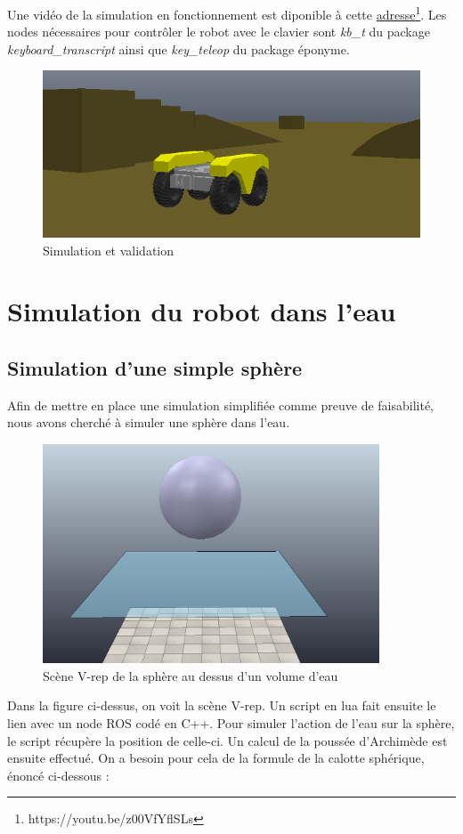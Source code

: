 \documentclass[12pt, openany]{report}
\begin{document}
Une vidéo de la simulation en fonctionnement est diponible à cette \href{https://youtu.be/z00VfYflSLs}{adresse}\footnote{https://youtu.be/z00VfYflSLs}. Les nodes nécessaires pour contrôler le robot avec le clavier sont \textit{kb\_t} du package \textit{keyboard\_transcript} ainsi que \textit{key\_teleop} du package éponyme. 

\begin{figure}[H]
     \centering
     \includegraphics[scale=0.5]{resu.png}     
     \caption{Simulation et validation}
     \label{fig:resu}
\end{figure}


\section{Simulation du robot dans l'eau}


\subsection{Simulation d'une simple sphère}
Afin de mettre en place une simulation simplifiée comme preuve de faisabilité, nous avons cherché à simuler une sphère dans l'eau.\\

\begin{figure}[H]
     \centering
     \includegraphics[width=10cm]{scene sphere.png}     
     \caption{Scène V-rep de la sphère au dessus d'un volume d'eau}
     \label{fig:resu}
\end{figure}
Dans la figure ci-dessus, on voit la scène V-rep. Un script en lua fait ensuite le lien avec un node ROS codé en C++. Pour simuler l'action de l'eau sur la sphère, le script récupère la position de celle-ci. Un calcul de la poussée d'Archimède est ensuite effectué. On a besoin pour cela de la formule de la calotte sphérique, énoncé ci-dessous : 
\end{document}
